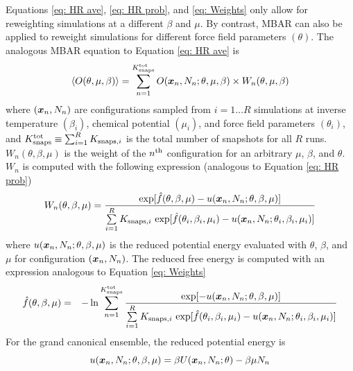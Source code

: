\documentclass[journal=jced,manuscript=article]{achemso}
\newcommand{\bfv}[1]{{\mbox{\boldmath{$#1$}}}}
\newcommand{\x}{\bfv{x}}
\begin{document}
Equations \ref{eq: HR ave}, \ref{eq: HR prob}, and \ref{eq: Weights} only allow for reweighting simulations at a different $\beta$ and $\mu$. By contrast, MBAR can also be applied to reweight simulations for different force field parameters $(\theta)$. The analogous MBAR equation to Equation \ref{eq: HR ave} is
\begin{eqnarray} \label{eq: MBAR ave}
\langle O(\theta,\mu,\beta)\rangle = \sum_{n=1}^{K^{\rm tot}_{\rm snaps}} O(\x_{n},N_n;\theta,\mu,\beta) \times W_{n}(\theta,\mu,\beta)
\end{eqnarray}
where $(\x_n,N_n)$ are configurations sampled from $i=1 \ldots R$ simulations at inverse temperature $(\beta_{i})$, chemical potential $(\mu_{i})$, and force field parameters $(\theta_i)$, and $K^{\rm tot}_{\rm snaps} \equiv \sum_{i=1}^R K_{\mathrm{snaps}, i}$ is the total number of snapshots for all $R$ runs. $W_{n}(\theta,\beta,\mu)$ is the weight of the $n^{\rm th}$ configuration for an arbitrary $\mu$, $\beta$, and $\theta$. $W_{n}$ is computed with the following expression (analogous to Equation \ref{eq: HR prob})
\begin{eqnarray} \label{eq: MBAR weights}
W_{n}(\theta,\beta,\mu) = \frac{\exp[\hat{f}(\theta,\beta,\mu)-u(\x_{n},N_n;\theta,\beta,\mu)]}{\sum\limits_{i=1}^R K_{\mathrm{snaps}, i} \, \exp[\hat{f}(\theta_i,\beta_{i},\mu_{i}) - u(\x_{n},N_n;\theta_i,\beta_{i},\mu_{i})]}
\end{eqnarray}
where $u(\x_{n},N_n;\theta,\beta,\mu)$ is the reduced potential energy evaluated with $\theta$, $\beta$, and $\mu$ for configuration $(\x_n,N_n)$. The reduced free energy is computed with an expression analogous to Equation \ref{eq: Weights}
\begin{eqnarray} \label{eq: MBAR free energy}
\hat f(\theta,\beta,\mu) &=& - \ln \sum_{n=1}^{K^{\rm tot}_{\rm snaps}}
\frac{\exp[-u(\x_{n},N_n;\theta,\beta,\mu)]}{\sum\limits_{i=1}^R K_{\mathrm{snaps}, i} \, \exp[\hat{f}(\theta_i,\beta_{i},\mu_{i}) - u(\x_{n},N_n;\theta_i,\beta_{i},\mu_{i})]}
\end{eqnarray}
For the grand canonical ensemble, the reduced potential energy is
\begin{equation} \label{eq: reduced potential}
u(\x_{n},N_n;\theta,\beta,\mu) = \beta U(\x_n,N_n;\theta) - \beta \mu N_n
\end{equation} 
\end{document}
